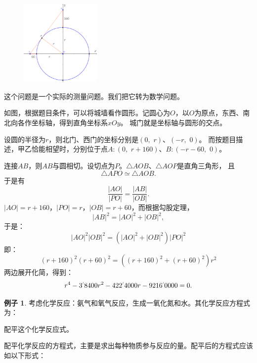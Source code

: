 \documentclass[12pt,UTF8]{ctexbook}
\newcommand{\dlim}[1]{^{\color{gray}\prime}#1}
\theoremstyle{definition}
\newtheorem{ex}{例子}[section]
\theoremstyle{plain}
\begin{document}
\begin{figure} %
    \vspace{-30pt}
    \flushright
    \includegraphics[width=0.35\textwidth]{tu/整式方程1.png}
\end{figure}

这个问题是一个实际的测量问题。我们把它转为数学问题。

如图，根据题目条件，可以将城墙看作圆形。记圆心为$O$，以$O$为原点，东西、南北向各作坐标轴，得到直角坐标系$xOy$。
城门就是坐标轴与圆形的交点。

设圆的半径为$r$，则北门、西门的坐标分别是$(0, \,\, r)$、$(-r, \,\, 0)$。
而按题目描述，甲乙恰能相望时，分别位于点$A:(0, \,\, r+160)$、$B:(-r-60, \,\, 0)$。

连接$AB$，则$AB$与圆相切。设切点为$P$。$\triangle AOB$、$\triangle AOP$是直角三角形，
且
$$ \triangle APO \simeq \triangle AOB.$$
于是有
$$ \frac{|AO|}{|PO|} = \frac{|AB|}{|OB|}.$$
$|AO| = r+160$，$|PO| = r$，$|OB| = r + 60$，而根据勾股定理，
$$ |AB|^2 = |AO|^2 + |OB|^2,$$
于是：
$$ |AO|^2 |OB|^2 = \left(|AO|^2 + |OB|^2\right) |PO|^2 $$
即：
$$ (r+160)^2 (r+60)^2 = \left((r+160)^2 + (r+60)^2\right) r^2 $$
两边展开化简，得到：
$$ r^4 - 3\dlim{8400} r^2 - 422\dlim{4000} r - 9216\dlim{0000} = 0. $$

\begin{ex}
  考虑化学反应：氨气和氧气反应，生成一氧化氮和水。其化学反应方程式为：

\begin{center}
\end{center}

  配平这个化学反应式。
\end{ex}

配平化学反应的方程式，主要是求出每种物质参与反应的量。配平后的方程式应该如以下形式：
\end{document}
